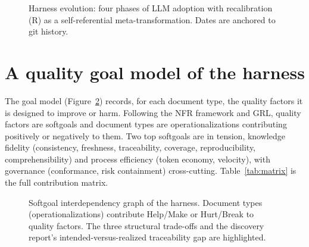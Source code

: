 \documentclass[sigconf]{acmart}
\begin{document}
\begin{figure}[t]
\centering
\resizebox{\columnwidth}{!}{}
\caption{Harness evolution: four phases of LLM adoption with recalibration (R) as a self-referential meta-transformation. Dates are anchored to git history.}
\label{fig:phases}
\end{figure}

\section{A quality goal model of the harness}
The goal model (Figure~\ref{fig:goal}) records, for each document type, the quality factors it is designed to improve or harm. Following the NFR framework and GRL, quality factors are softgoals and document types are operationalizations contributing positively or negatively to them. Two top softgoals are in tension, knowledge fidelity (consistency, freshness, traceability, coverage, reproducibility, comprehensibility) and process efficiency (token economy, velocity), with governance (conformance, risk containment) cross-cutting. Table~\ref{tab:matrix} is the full contribution matrix.

\begin{figure}[t]
\centering
\resizebox{\columnwidth}{!}{}
\caption{Softgoal interdependency graph of the harness. Document types (operationalizations) contribute Help/Make or Hurt/Break to quality factors. The three structural trade-offs and the discovery report's intended-versus-realized traceability gap are highlighted.}
\label{fig:goal}
\end{figure}
\end{document}
